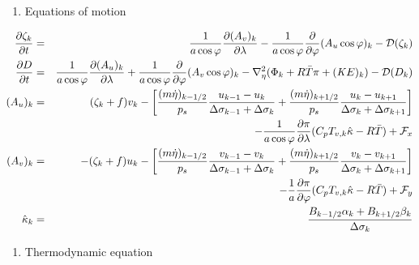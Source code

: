 \begin{enumerate}
\def\labelenumi{\arabic{enumi}.}
\tightlist
\item
  Equations of motion
\end{enumerate}

\begin{eqnarray}\begin{aligned}
  \frac{\partial \zeta_k}{\partial t}
        &=&   \frac{1}{a\cos\varphi}
            \frac{\partial (A_v)_k}{\partial \lambda}
          - \frac{1}{a\cos\varphi}
            \frac{\partial }{\partial \varphi} (A_u \cos\varphi)_k
          - {\mathcal D}(\zeta_k) \\
  \frac{\partial D}{\partial t}
        &=&   \frac{1}{a\cos\varphi}
            \frac{\partial (A_u)_k}{\partial \lambda}
          + \frac{1}{a\cos\varphi}
            \frac{\partial }{\partial \varphi} (A_v \cos\varphi)_k
          - \nabla^{2}_{\eta}
           ( \Phi_k + R\bar{T} \pi
             + ({\mathit KE})_k )
          - {\mathcal D}(D_k) \\
  (A_u)_k
    &=&  ( \zeta_k + f ) v_k
             - \left[ \frac{(m\dot{\eta})_{k-1/2}}{p_s} \frac{u_{k-1} - u_k}{\Delta\sigma_{k-1}+\Delta\sigma_k}
               + \frac{(m\dot{\eta})_{k+1/2}}{p_s} \frac{u_k   - u_{k+1}}{\Delta\sigma_{k}+\Delta\sigma_{k+1}} \right] \notag\\
           &&- \frac{1}{a\cos\varphi} \frac{\partial \pi}{\partial \lambda}(C_p T_{v,k}\hat{\kappa}-R\bar{T})
             + {\mathcal F}_x \\
  (A_v)_k
    &=&  - ( \zeta_k + f ) u_k
             - \left[ \frac{(m\dot{\eta})_{k-1/2}}{p_s} \frac{v_{k-1} - v_k}{\Delta\sigma_{k-1}+\Delta\sigma_k}
               + \frac{(m\dot{\eta})_{k+1/2}}{p_s} \frac{v_k   - v_{k+1}}{\Delta\sigma_{k}+\Delta\sigma_{k+1}} \right] \notag\\
           &&- \frac{1}{a} \frac{\partial \pi}{\partial \varphi}(C_p T_{v,k}\hat{\kappa}-R\bar{T})
             + {\mathcal F}_y \\
   \hat{\kappa}_k
    &=& \frac{ B_{k-1/2} \alpha_k + B_{k+1/2} \beta_k }
            { \Delta\sigma_k                                  }\end{aligned}\end{eqnarray}

\begin{enumerate}
\def\labelenumi{\arabic{enumi}.}
\tightlist
\item
  Thermodynamic equation
\end{enumerate}


